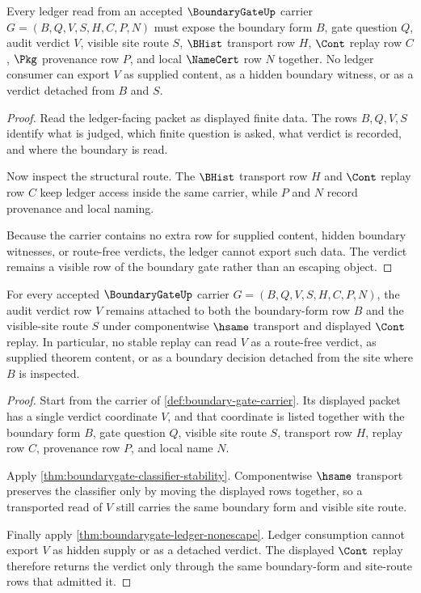 \begin{theorem}
\label{thm:boundarygate-ledger-nonescape}
Every ledger read from an accepted $\BoundaryGateUp$ carrier $G=(B,Q,V,S,H,C,P,N)$ must expose the boundary form $B$, gate question $Q$, audit verdict $V$, visible site route $S$, $\BHist$ transport row $H$, $\Cont$ replay row $C$, $\Pkg$ provenance row $P$, and local $\NameCert$ row $N$ together. No ledger consumer can export $V$ as supplied content, as a hidden boundary witness, or as a verdict detached from $B$ and $S$.
\end{theorem}
\begin{proof}
Read the ledger-facing packet as displayed finite data. The rows $B,Q,V,S$ identify what is judged, which finite question is asked, what verdict is recorded, and where the boundary is read.

Now inspect the structural route. The $\BHist$ transport row $H$ and $\Cont$ replay row $C$ keep ledger access inside the same carrier, while $P$ and $N$ record provenance and local naming.

Because the carrier contains no extra row for supplied content, hidden boundary witnesses, or route-free verdicts, the ledger cannot export such data. The verdict remains a visible row of the boundary gate rather than an escaping object.
\end{proof}

\begin{theorem}
\label{thm:boundarygate-verdict-site-route-stability}
For every accepted $\BoundaryGateUp$ carrier $G=(B,Q,V,S,H,C,P,N)$, the audit verdict row $V$ remains attached to both the boundary-form row $B$ and the visible-site route $S$ under componentwise $\hsame$ transport and displayed $\Cont$ replay. In particular, no stable replay can read $V$ as a route-free verdict, as supplied theorem content, or as a boundary decision detached from the site where $B$ is inspected.
\end{theorem}
\begin{proof}
Start from the carrier of \autoref{def:boundary-gate-carrier}. Its displayed packet has a single verdict coordinate $V$, and that coordinate is listed together with the boundary form $B$, gate question $Q$, visible site route $S$, transport row $H$, replay row $C$, provenance row $P$, and local name $N$.

Apply \autoref{thm:boundarygate-classifier-stability}. Componentwise $\hsame$ transport preserves the classifier only by moving the displayed rows together, so a transported read of $V$ still carries the same boundary form and visible site route.

Finally apply \autoref{thm:boundarygate-ledger-nonescape}. Ledger consumption cannot export $V$ as hidden supply or as a detached verdict. The displayed $\Cont$ replay therefore returns the verdict only through the same boundary-form and site-route rows that admitted it.
\end{proof}

